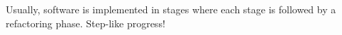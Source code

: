 %
Usually, software is implemented in stages where each stage is followed by a refactoring phase. Step-like progress!